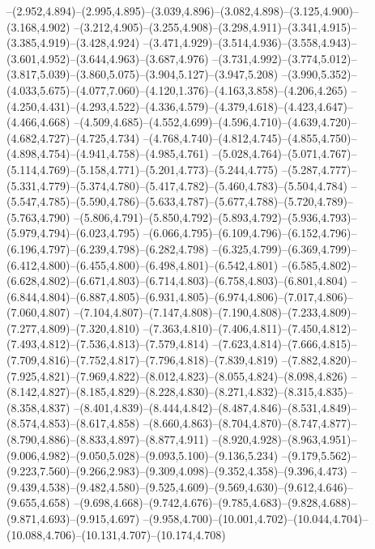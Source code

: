   --(2.952,4.894)--(2.995,4.895)--(3.039,4.896)--(3.082,4.898)--(3.125,4.900)--(3.168,4.902)%
  --(3.212,4.905)--(3.255,4.908)--(3.298,4.911)--(3.341,4.915)--(3.385,4.919)--(3.428,4.924)%
  --(3.471,4.929)--(3.514,4.936)--(3.558,4.943)--(3.601,4.952)--(3.644,4.963)--(3.687,4.976)%
  --(3.731,4.992)--(3.774,5.012)--(3.817,5.039)--(3.860,5.075)--(3.904,5.127)--(3.947,5.208)%
  --(3.990,5.352)--(4.033,5.675)--(4.077,7.060)--(4.120,1.376)--(4.163,3.858)--(4.206,4.265)%
  --(4.250,4.431)--(4.293,4.522)--(4.336,4.579)--(4.379,4.618)--(4.423,4.647)--(4.466,4.668)%
  --(4.509,4.685)--(4.552,4.699)--(4.596,4.710)--(4.639,4.720)--(4.682,4.727)--(4.725,4.734)%
  --(4.768,4.740)--(4.812,4.745)--(4.855,4.750)--(4.898,4.754)--(4.941,4.758)--(4.985,4.761)%
  --(5.028,4.764)--(5.071,4.767)--(5.114,4.769)--(5.158,4.771)--(5.201,4.773)--(5.244,4.775)%
  --(5.287,4.777)--(5.331,4.779)--(5.374,4.780)--(5.417,4.782)--(5.460,4.783)--(5.504,4.784)%
  --(5.547,4.785)--(5.590,4.786)--(5.633,4.787)--(5.677,4.788)--(5.720,4.789)--(5.763,4.790)%
  --(5.806,4.791)--(5.850,4.792)--(5.893,4.792)--(5.936,4.793)--(5.979,4.794)--(6.023,4.795)%
  --(6.066,4.795)--(6.109,4.796)--(6.152,4.796)--(6.196,4.797)--(6.239,4.798)--(6.282,4.798)%
  --(6.325,4.799)--(6.369,4.799)--(6.412,4.800)--(6.455,4.800)--(6.498,4.801)--(6.542,4.801)%
  --(6.585,4.802)--(6.628,4.802)--(6.671,4.803)--(6.714,4.803)--(6.758,4.803)--(6.801,4.804)%
  --(6.844,4.804)--(6.887,4.805)--(6.931,4.805)--(6.974,4.806)--(7.017,4.806)--(7.060,4.807)%
  --(7.104,4.807)--(7.147,4.808)--(7.190,4.808)--(7.233,4.809)--(7.277,4.809)--(7.320,4.810)%
  --(7.363,4.810)--(7.406,4.811)--(7.450,4.812)--(7.493,4.812)--(7.536,4.813)--(7.579,4.814)%
  --(7.623,4.814)--(7.666,4.815)--(7.709,4.816)--(7.752,4.817)--(7.796,4.818)--(7.839,4.819)%
  --(7.882,4.820)--(7.925,4.821)--(7.969,4.822)--(8.012,4.823)--(8.055,4.824)--(8.098,4.826)%
  --(8.142,4.827)--(8.185,4.829)--(8.228,4.830)--(8.271,4.832)--(8.315,4.835)--(8.358,4.837)%
  --(8.401,4.839)--(8.444,4.842)--(8.487,4.846)--(8.531,4.849)--(8.574,4.853)--(8.617,4.858)%
  --(8.660,4.863)--(8.704,4.870)--(8.747,4.877)--(8.790,4.886)--(8.833,4.897)--(8.877,4.911)%
  --(8.920,4.928)--(8.963,4.951)--(9.006,4.982)--(9.050,5.028)--(9.093,5.100)--(9.136,5.234)%
  --(9.179,5.562)--(9.223,7.560)--(9.266,2.983)--(9.309,4.098)--(9.352,4.358)--(9.396,4.473)%
  --(9.439,4.538)--(9.482,4.580)--(9.525,4.609)--(9.569,4.630)--(9.612,4.646)--(9.655,4.658)%
  --(9.698,4.668)--(9.742,4.676)--(9.785,4.683)--(9.828,4.688)--(9.871,4.693)--(9.915,4.697)%
  --(9.958,4.700)--(10.001,4.702)--(10.044,4.704)--(10.088,4.706)--(10.131,4.707)--(10.174,4.708)%
